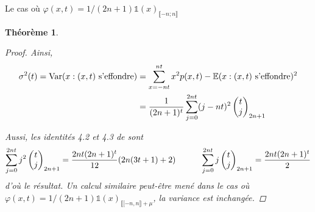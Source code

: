 \documentclass{article}
\newtheorem{theorem}{Théorème}[section]
\theoremstyle{definition}
\begin{document}
\begin{section}{Le cas où $\varphi(x, t) = 1/(2n+1)\mathds{1}(x)_{\llbracket -n; n\rrbracket}$}
\begin{theorem}
\begin{proof}
		Ainsi, \begin{align*}
			\sigma^2(t) = \textup{Var}(x : (x,t) \textup{ s'effondre}) &=\sum_{x=-nt}^{nt} x^2 p(x,t) - \mathbb{E}(x : (x,t) \textup{ s'effondre})^2\\& = \frac{1}{(2n+1)^t} \sum_{j=0}^{2nt} (j-nt)^2 \begin{pmatrix}t\\j\end{pmatrix}_{2n+1} 
		\end{align*}

		Aussi, les identités 4.2 et 4.3 de \cite{h2} sont
		\begin{align*}
			\sum_{j=0}^{2n t} j^2 \begin{pmatrix} t\\j\end{pmatrix}_{2n+1} = \frac{2nt (2n+1)^t}{12} (2n (3t+1)+2) \indent \indent \sum_{j=0}^{2n t} j \begin{pmatrix} t\\j \end{pmatrix}_{2n+1}  = \frac{2 nt (2n+1)^t}{2}
		\end{align*}
		d'où le résultat. Un calcul similaire peut-être mené dans le cas où $\varphi(x,t) = 1/(2n+1)\mathds{1}(x)_{\llbracket[-n,n\rrbracket+\mu}$, la variance est inchangée.
	\end{proof}
\end{theorem}
%

\end{section}
\end{document}
